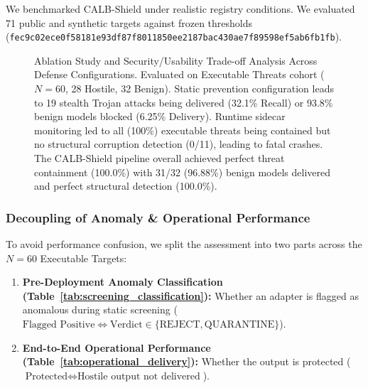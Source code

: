 We benchmarked CALB-Shield under realistic registry conditions. We evaluated 71 public and synthetic targets against frozen thresholds (\nolinkurl{fec9c02ece0f58181e93df87f8011850ee2187bac430ae7f89598ef5ab6fb1fb}).

\begin{figure}[t]
\centering
{}
\caption{Ablation Study and Security/Usability Trade-off Analysis Across Defense Configurations. Evaluated on Executable Threats cohort ($N=60$, 28 Hostile, 32 Benign). Static prevention configuration leads to 19 stealth Trojan attacks being delivered (32.1\% Recall) or 93.8\% benign models blocked (6.25\% Delivery). Runtime sidecar monitoring led to all (100\%) executable threats being contained but no structural corruption detection (0/11), leading to fatal crashes. The CALB-Shield pipeline overall achieved perfect threat containment (100.0\%) with 31/32 (96.88\%) benign models delivered and perfect structural detection (100.0\%).}
\label{fig:ablation_tradeoffs}
\end{figure}

\subsubsection{Decoupling of Anomaly \& Operational Performance}
To avoid performance confusion, we split the assessment into two parts across the $N=60$ Executable Targets:
\begin{enumerate}
    \item \textbf{Pre-Deployment Anomaly Classification (Table~\ref{tab:screening_classification}):} Whether an adapter is flagged as anomalous during static screening ($\text{Flagged Positive} \iff \text{Verdict} \in \{\text{REJECT}, \text{QUARANTINE}\}$).
    \item \textbf{End-to-End Operational Performance (Table~\ref{tab:operational_delivery}):} Whether the output is protected ($\text{Protected} \iff \text{Hostile output not delivered}$).
\end{enumerate}

